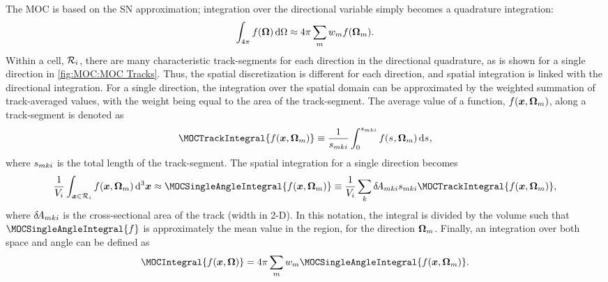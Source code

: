 {{{            The \ac{MOC} is based on the \acf{SN} approximation; integration over the directional variable simply becomes a quadrature integration:
            \begin{equation}\label{eq:MOC:Directional Quadrature Integration}
                \intl[\fourpi]f(\dir)\ddir \approx \fourpi\suml[m]\wt[m]f(\dirm).
            \end{equation}
            Within a cell, $\Region$, there are many characteristic track-segments for each direction in the directional quadrature, as is shown for a single direction in \cref{fig:MOC:MOC Tracks}.
            Thus, the spatial discretization is different for each direction, and spatial integration is linked with the directional integration.
            For a single direction, the integration over the spatial domain can be approximated by the weighted summation of track-averaged values, with the weight being equal to the area of the track-segment.
            The average value of a function, $f(\loc,\dirm)$, along a track-segment is denoted as
            \begin{equation}\label{eq:MOC:Track-Averaged Definition UnRenormalized}
                \MOCTrackIntegral{f(\loc,\dirm)} \defined \frac{1}{\segl}\intl[0][\segl]f(\len,\dirm)\dif{\len},
            \end{equation}
            where $\segl$ is the total length of the track-segment.
            The spatial integration for a single direction becomes
            \begin{equation}\label{eq:MOC:Spatial Averaging Definition UnRenormalized}
                \frac{1}{V_i}\intl[\loc\in\Region]f(\loc,\dirm)\dif^3{\loc} \approx \MOCSingleAngleIntegral{f(\loc,\dirm)} \defined \frac{1}{V_i}\suml[k]\tA[mki]\segl\MOCTrackIntegral{f(\loc,\dirm)} ,
            \end{equation}
            where $\tA[mki]$ is the cross-sectional area of the track (width in 2-D).
            In this notation, the integral is divided by the volume such that $\MOCSingleAngleIntegral{f}$ is approximately the mean value in the region, for the direction $\dirm$.
            Finally, an integration over both space and angle can be defined as
            \begin{equation}\label{eq:MOC:Spatial and Directional Integration Definition}
                \MOCIntegral{f(\loc,\dir)} = \fourpi\suml[m]\wt[m]\MOCSingleAngleIntegral{f(\loc,\dirm)}.
            \end{equation}

}}}

